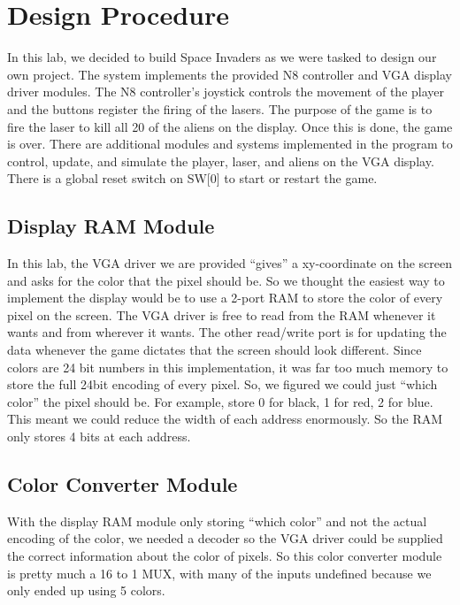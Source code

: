 \documentclass[11pt, titlepage]{article}
\author{Donovan Clay (ID: 2276005), Cameron Jennings (ID: 2029631)}
\title{\assignmentname}
\date{\parbox{\linewidth}{\centering
\experimentDate
  \endgraf\bigskip
  \className\
}}
\begin{document}
	\maketitle
 
    \setcounter{tocdepth}{2}
    \begin{center}
        \tableofcontents\label{beginning}
    \end{center}
    \newpage
    
    \section{Design Procedure}
    In this lab, we decided to build Space Invaders as we were tasked to design our own project. The system implements the provided N8 controller and VGA display driver modules. The N8 controller's joystick controls the movement of the player and the buttons register the firing of the lasers. The purpose of the game is to fire the laser to kill all 20 of the aliens on the display. Once this is done, the game is over. There are additional modules and systems implemented in the program to control, update, and simulate the player, laser, and aliens on the VGA display. There is a global reset switch on SW[0] to start or restart the game.
        
        \subsection{Display RAM Module}
            In this lab, the VGA driver we are provided ``gives'' a xy-coordinate on the screen and asks for the color that the pixel should be. So we thought the easiest way to implement the display would be to use a 2-port RAM to store the color of every pixel on the screen. The VGA driver is free to read from the RAM whenever it wants and from wherever it wants. The other read/write port is for updating the data whenever the game dictates that the screen should look different. Since colors are 24 bit numbers in this implementation, it was far too much memory to store the full 24bit encoding of every pixel. So, we figured we could just ``which color'' the pixel should be. For example, store 0 for black, 1 for red, 2 for blue. This meant we could reduce the width of each address enormously. So the RAM only stores 4 bits at each address.

        \subsection{Color Converter Module}
            With the display RAM module only storing ``which color'' and not the actual encoding of the color, we needed a decoder so the VGA driver could be supplied the correct information about the color of pixels. So this color converter module is pretty much a 16 to 1 MUX, with many of the inputs undefined because we only ended up using 5 colors. 
\end{document}
